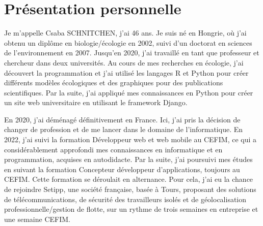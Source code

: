 \section{Présentation personnelle}\label{sec:presentation-personnelle}


Je m'appelle Csaba SCHNITCHEN, j'ai 46 ans. Je suis né en Hongrie, où j'ai obtenu un diplôme en biologie/écologie en 2002, suivi d'un doctorat en sciences de l'environnement en 2007. Jusqu'en 2020, j'ai travaillé en tant que professeur et chercheur dans deux universités. Au cours de mes recherches en écologie, j'ai découvert la programmation et j'ai utilisé les langages R et Python pour créer différents modèles écologiques et des graphiques pour des publications scientifiques. Par la suite, j'ai appliqué mes connaissances en Python pour créer un site web universitaire en utilisant le framework Django.

En 2020, j'ai déménagé définitivement en France. Ici, j'ai pris la décision de changer de profession et de me lancer dans le domaine de l'informatique. En 2022, j'ai suivi la formation Développeur web et web mobile au CEFIM, ce qui a considérablement approfondi mes connaissances en informatique et en programmation, acquises en autodidacte. Par la suite, j'ai poursuivi mes études en suivant la formation Concepteur développeur d'applications, toujours au CEFIM. Cette formation se déroulait en alternance. Pour cela, j'ai eu la chance de rejoindre Setipp, une société française, basée à Tours, proposant des solutions de télécommunications, de sécurité des travailleurs isolés et de géolocalisation professionnelle/gestion de flotte, sur un rythme de trois semaines en entreprise et une semaine CEFIM.